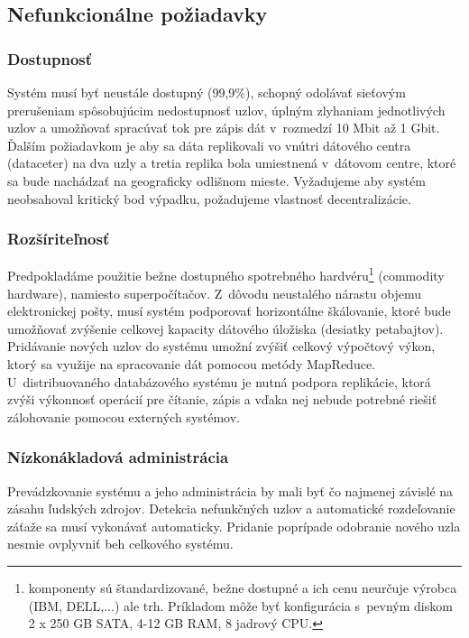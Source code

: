 \documentclass[11pt,twoside,a4paper]{book}
\begin{document}



\subsection{Nefunkcionálne požiadavky}

\subsubsection*{Dostupnosť}
Systém musí byť neustále dostupný (99,9\%), schopný odolávať sieťovým prerušeniam spôsobujúcim nedostupnosť uzlov, úplným zlyhaniam jednotlivých uzlov a umožňovať spracúvať tok pre zápis dát v~rozmedzí 10 Mbit až 1 Gbit. Ďalším požiadavkom je aby sa dáta replikovali vo vnútri dátového centra (dataceter) na dva uzly a tretia replika bola umiestnená v~dátovom centre, ktoré sa bude nachádzať na geograficky odlišnom mieste. Vyžadujeme aby systém neobsahoval kritický bod výpadku, požadujeme vlastnosť decentralizácie.

\subsubsection*{Rozšíriteľnosť}
Predpokladáme použitie bežne dostupného spotrebného hardvéru\footnote{komponenty sú štandardizované, bežne dostupné a ich cenu neurčuje výrobca (IBM, DELL,...) ale trh. Príkladom môže byť konfigurácia s~pevným diskom 2 x 250 GB SATA, 4-12 GB RAM, 8 jadrový CPU.} (commodity hardware), namiesto superpočítačov. Z~dôvodu neustalého nárastu objemu elektronickej pošty, musí systém podporovať horizontálne škálovanie, ktoré bude umožňovať zvýšenie celkovej kapacity dátového úložiska (desiatky petabajtov). Pridávanie nových uzlov do systému umožní zvýšiť celkový výpočtový výkon, ktorý sa využije na spracovanie dát pomocou metódy MapReduce. U~distribuovaného databázového systému je nutná podpora replikácie, ktorá zvýši výkonnosť operácií pre čítanie, zápis a vďaka nej nebude potrebné riešiť zálohovanie pomocou externých systémov.

\subsubsection*{Nízkonákladová administrácia}
Prevádzkovanie systému a jeho administrácia by mali byť čo najmenej závislé na zásahu ľudských zdrojov. Detekcia nefunkčných uzlov a automatické rozdeľovanie záťaže sa musí vykonávať automaticky. Pridanie poprípade odobranie nového uzla nesmie ovplyvniť beh celkového systému.
\end{document}
